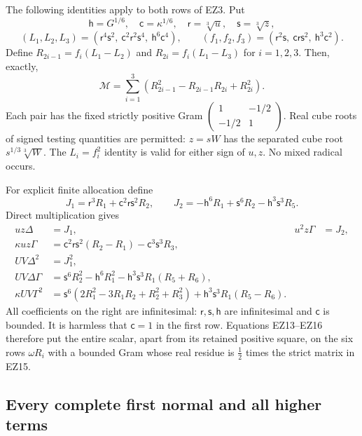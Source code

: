 The following identities apply to both rows of EZ3. Put
\[
 \mathsf h=G^{1/6},\quad\mathsf c=\kappa^{1/6},\quad
 \mathsf r=\sqrt[3]u,\quad\mathsf s=\sqrt[3]z,
\]
\[
 (L_1,L_2,L_3)=
 (\mathsf r^4\mathsf s^2,\
   \mathsf c^2\mathsf r^2\mathsf s^4,\
   \mathsf h^6\mathsf c^4),\qquad
 (f_1,f_2,f_3)=
 (\mathsf r^2\mathsf s,\
   \mathsf c\mathsf r\mathsf s^2,\
   \mathsf h^3\mathsf c^2).
\]
Define $R_{2i-1}=f_i(L_1-L_2)$ and
$R_{2i}=f_i(L_1-L_3)$ for $i=1,2,3$.
Then, exactly,
\[
 \mathcal M=\sum_{i=1}^3
       (R_{2i-1}^2-R_{2i-1}R_{2i}+R_{2i}^2).                  \tag{EZ15}
\]
Each pair has the fixed strictly positive Gram
$\left(\begin{smallmatrix}1&-1/2\\-1/2&1\end{smallmatrix}\right)$.
Real cube roots of signed testing quantities are permitted:
$z=sW$ has the separated cube root
$s^{1/3}\sqrt[3]W$. The $L_i=f_i^2$ identity is valid for
either sign of $u,z$. No mixed radical occurs.

For explicit finite allocation define
\[
 J_1=\mathsf r^3R_1+\mathsf c^2\mathsf r\mathsf s^2R_2,\qquad
 J_2=-\mathsf h^6R_1+\mathsf s^6R_2
                              -\mathsf h^3\mathsf s^3R_5.
\]
Direct multiplication gives
\[
\begin{aligned}
 uz\Delta&=J_1,&u^2z\Gamma&=J_2,\\
 \kappa uz\Gamma
   &=\mathsf c^2\mathsf r\mathsf s^2(R_2-R_1)
                                  -\mathsf c^3\mathsf s^3R_3,\\
 UV\Delta^2&=J_1^2,\\
 UV\Delta\Gamma
   &=\mathsf s^6R_2^2-\mathsf h^6R_1^2
             -\mathsf h^3\mathsf s^3R_1(R_5+R_6),\\
 \kappa UV\Gamma^2
   &=\mathsf s^6(2R_1^2-3R_1R_2+R_2^2+R_3^2)
                      +\mathsf h^3\mathsf s^3R_1(R_5-R_6).
\end{aligned}                                                   \tag{EZ16}
\]
All coefficients on the right are infinitesimal: $\mathsf r,
\mathsf s,\mathsf h$ are infinitesimal and $\mathsf c$ is
bounded. It is harmless that $\mathsf c=1$ in the first row.
Equations EZ13--EZ16 therefore put the entire scalar, apart
from its retained positive square, on the six rows $\omega R_i$
with a bounded Gram whose real residue is $\tfrac12$ times the
strict matrix in EZ15.

\subsection{Every complete first normal and all higher terms}

